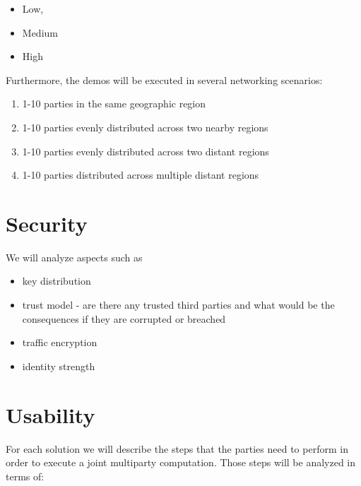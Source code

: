 \begin{itemize}
\tightlist
\item
  Low,
\item
  Medium
\item
  High
\end{itemize}

Furthermore, the demos will be executed in several networking scenarios:

\begin{enumerate}
\def\labelenumi{\arabic{enumi}.}
\tightlist
\item
  1-10 parties in the same geographic region
\item
  1-10 parties evenly distributed across two nearby regions
\item
  1-10 parties evenly distributed across two distant regions
\item
  1-10 parties distributed across multiple distant regions
\end{enumerate}

\hypertarget{security}{%
\section{Security}\label{security}}

We will analyze aspects such as

\begin{itemize}
\tightlist
\item
  key distribution
\item
  trust model - are there any trusted third parties and what would be
  the consequences if they are corrupted or breached
\item
  traffic encryption
\item
  identity strength
\end{itemize}

\hypertarget{usability}{%
\section{Usability}\label{usability}}

For each solution we will describe the steps that the parties need to
perform in order to execute a joint multiparty computation. Those steps
will be analyzed in terms of:

